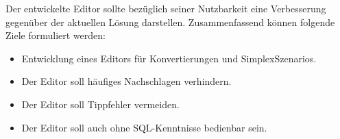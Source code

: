 \pskip
Der entwickelte Editor sollte bezüglich seiner Nutzbarkeit eine Verbesserung gegenüber der aktuellen Lösung darstellen. Zusammenfassend können folgende Ziele formuliert werden:
\begin{itemize}
  \item Entwicklung eines Editors für Konvertierungen und SimplexSzenarios.
  \item Der Editor soll häufiges Nachschlagen verhindern.
  \item Der Editor soll Tippfehler vermeiden.
  \item Der Editor soll auch ohne \ac{SQL}-Kenntnisse bedienbar sein.
\end{itemize}
